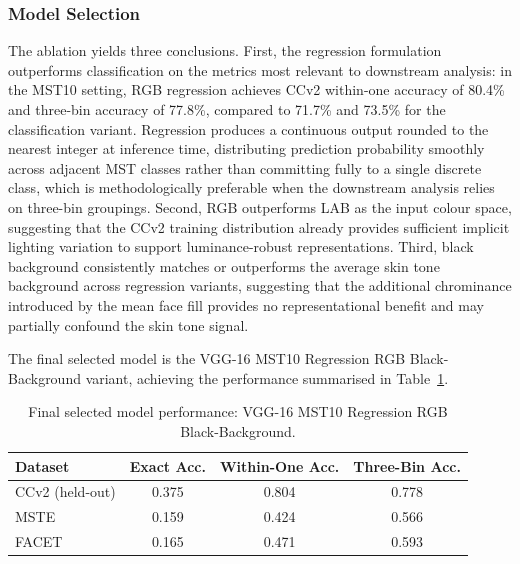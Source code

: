\subsubsection{Model Selection}
\label{subsubsec:skintone_selection}

The ablation yields three conclusions. First, the regression formulation outperforms classification on the metrics most relevant to downstream analysis: in the MST10 setting, RGB regression achieves CCv2 within-one accuracy of 80.4\% and three-bin accuracy of 77.8\%, compared to 71.7\% and 73.5\% for the classification variant. Regression produces a continuous output rounded to the nearest integer at inference time, distributing prediction probability smoothly across adjacent MST classes rather than committing fully to a single discrete class, which is methodologically preferable when the downstream analysis relies on three-bin groupings. Second, RGB outperforms LAB as the input colour space, suggesting that the CCv2 training distribution already provides sufficient implicit lighting variation to support luminance-robust representations. Third, black background consistently matches or outperforms the average skin tone background across regression variants, suggesting that the additional chrominance introduced by the mean face fill provides no representational benefit and may partially confound the skin tone signal.

The final selected model is the VGG-16 MST10 Regression RGB Black-Background variant, achieving the performance summarised in Table~\ref{tab:vgg16_final}.

\begin{table}[H]
	\centering
	\footnotesize
	\begin{tabular}{lccc}
		\toprule
		\textbf{Dataset} & \textbf{Exact Acc.} & \textbf{Within-One Acc.} & \textbf{Three-Bin Acc.} \\
		\midrule
		CCv2 (held-out)  & 0.375               & 0.804                    & 0.778                   \\
		MSTE             & 0.159               & 0.424                    & 0.566                   \\
		FACET            & 0.165               & 0.471                    & 0.593                   \\
		\bottomrule
	\end{tabular}
	\caption{Final selected model performance: VGG-16 MST10 Regression RGB Black-Background.}
	\label{tab:vgg16_final}
\end{table}


